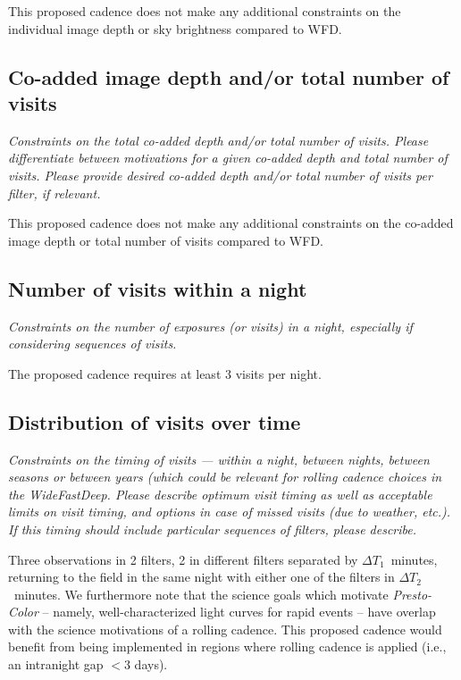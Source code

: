 \documentclass[12pt, letterpaper]{article}
\newcommand{\dtone}{\ensuremath{\Delta T_1}}
\newcommand{\dttwo}{\ensuremath{\Delta T_2}}
\begin{document}
This proposed cadence does not make any additional constraints on the individual image depth or sky brightness compared to WFD. 


\subsection{Co-added image depth and/or total number of visits}
\begin{footnotesize}{\it  Constraints on the total co-added depth and/or total number of visits. Please differentiate between motivations for a given co-added depth and total number of visits. Please provide desired co-added depth and/or total number of visits per filter, if relevant.}
\end{footnotesize}

This proposed cadence does not make any additional constraints on the co-added image depth or total number of visits compared to WFD. 


\subsection{Number of visits within a night}
\begin{footnotesize}{\it Constraints on the number of exposures (or visits) in a night, especially if considering sequences of visits.}
\end{footnotesize}

The proposed cadence requires at least 3 visits per night.

\subsection{Distribution of visits over time}
\begin{footnotesize}{\it Constraints on the timing of visits --- within a night, between nights, between seasons or between years (which could be relevant for rolling cadence choices in the WideFastDeep. Please describe optimum visit timing as well as acceptable limits on visit timing, and options in case of missed visits (due to weather, etc.). If this timing should include particular sequences of filters, please describe.}
\end{footnotesize}

Three observations in 2 filters, 2 in different filters separated by \dtone\ minutes, returning to the field in the same night with either one of the filters in \dttwo\ minutes. We furthermore note that the science goals which motivate {\em Presto-Color} -- namely, well-characterized light curves for rapid events -- have overlap with the science motivations of a rolling cadence. This proposed cadence would benefit from being implemented in regions where rolling cadence is applied (i.e., an intranight gap $<3$ days).
\end{document}
